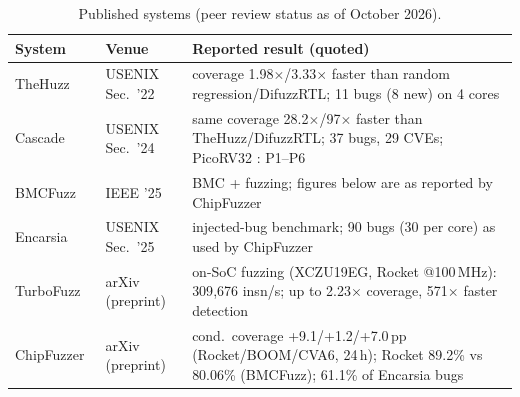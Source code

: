 \documentclass[conference,10pt]{IEEEtran}
\newcommand{\code}[1]{\texttt{\detokenize{#1}}}
\begin{document}
\begin{table}[t]
\centering\scriptsize
\caption{Published systems (peer review status as of October 2026).}\label{tab:lit}
\begin{tabularx}{\textwidth}{@{}l l X@{}}
\toprule
System & Venue & Reported result (quoted)\\
\midrule
TheHuzz~\cite{thehuzz} & USENIX Sec.\ '22 & coverage 1.98$\times$/3.33$\times$ faster than random regression/DifuzzRTL; 11 bugs (8 new) on 4 cores\\
Cascade~\cite{cascade} & USENIX Sec.\ '24 & same coverage 28.2$\times$/97$\times$ faster than TheHuzz/DifuzzRTL; 37 bugs, 29 CVEs; PicoRV32 \code{f00a88c}: P1--P6\\
BMCFuzz~\cite{bmcfuzz} & IEEE '25 & BMC + fuzzing; figures below are as reported by ChipFuzzer\\
Encarsia~\cite{encarsia} & USENIX Sec.\ '25 & injected-bug benchmark; 90 bugs (30 per core) as used by ChipFuzzer\\
TurboFuzz~\cite{turbofuzz} & arXiv (preprint) & on-SoC fuzzing (XCZU19EG, Rocket @100\,MHz): 309{,}676 insn/s; up to 2.23$\times$ coverage, 571$\times$ faster detection\\
ChipFuzzer~\cite{chipfuzzer} & arXiv (preprint) & cond.\ coverage +9.1/+1.2/+7.0\,pp (Rocket/BOOM/CVA6, 24\,h); Rocket 89.2\% vs 80.06\% (BMCFuzz); 61.1\% of Encarsia bugs\\
\bottomrule
\end{tabularx}
\end{table}
\end{document}
